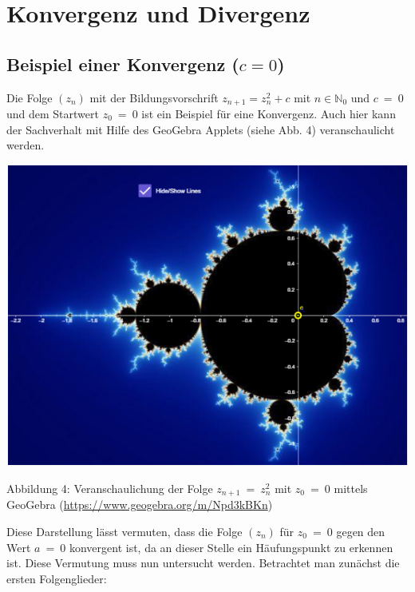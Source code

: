\documentclass[a4paper, 12pt]{book}
\begin{document}
\chapter{Konvergenz und Divergenz}

\section{Beispiel einer Konvergenz ($c=0$)}

Die Folge \(\left( z_{n} \right)\) mit der Bildungsvorschrift
\(z_{n + 1} = z_{n}^{2} + c\) mit \(n \in \mathbb{N}_{0}\) und
\(c\  = \ 0\) und dem Startwert \(z_{0}\  = \ 0\) ist ein Beispiel für
eine Konvergenz. Auch hier kann der Sachverhalt mit Hilfe des GeoGebra
Applets (siehe Abb. 4) veranschaulicht werden.

\includegraphics[width=\linewidth]{image9.png}

\protect\hypertarget{_Toc167901654}{}{}Abbildung 4: Veranschaulichung
der Folge \(z_{n + 1}\  = \ z_{n}^{2}\) mit \(z_{0}\  = \ 0\) mittels
GeoGebra (\url{https://www.geogebra.org/m/Npd3kBKn})

Diese Darstellung lässt vermuten, dass die Folge
\(\left( z_{n} \right)\) für \(z_{0}\  = \ 0\) gegen den Wert
\(a\  = \ 0\) konvergent ist, da an dieser Stelle ein Häufungspunkt zu
erkennen ist. Diese Vermutung muss nun untersucht werden. Betrachtet man
zunächst die ersten Folgenglieder:
\end{document}
